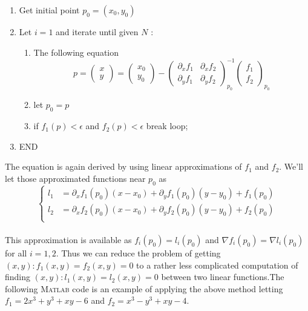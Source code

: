 \documentclass[paper=a4, fontsize=11pt]{scrartcl}
\newcommand{\MATLAB}{\textsc{Matlab}\xspace}
\begin{document}
\begin{enumerate}[label=\arabic*)]
	\item Get initial point $p_0=(x_0,y_0)$
	\item Let $i=1$ and iterate until given $N$ :
	\begin{enumerate}[label=(\arabic*)]
		\item The following equation \\
		\begin{equation}\nonumber
			p =
			\begin{pmatrix}
			 x \\ y
			\end{pmatrix}
			= 
			\begin{pmatrix}
			x_0 \\ y_0
			\end{pmatrix}
			-
			\begin{pmatrix}
			\partial_x f_1 & \partial_x f_2\\
			\partial_y f_1 & \partial_y f_2 
			\end{pmatrix}^{-1}_{p_0}
			\begin{pmatrix}
			f_1 \\ f_2
			\end{pmatrix}_{p_0}
		\end{equation}
		\item let $p_0=p$
		\item if $f_1(p) < \epsilon$ and $f_2(p) < \epsilon$ break loop;
	\end{enumerate}
	\item END \\
\end{enumerate} 

The equation is again derived by using linear approximations of $f_1$ and $f_2$. We'll let those approximated functions near $p_0$ as \\

\begin{equation}\nonumber
	\begin{cases}
	l_1 &= \partial_x f_1(p_0) (x-x_0)+ \partial_y f_1(p_0) (y-y_0) + f_1(p_0)\\
	l_2 &= \partial_x f_2(p_0) (x-x_0)+ \partial_y f_2(p_0) (y-y_0) + f_2(p_0) \\
	\end{cases}
\end{equation}\\

This approximation is available as $f_i(p_0)=l_i(p_0)$ and $\nabla f_i(p_0) = \nabla l_i (p_0)$ for all $i=1,2$. Thus we can reduce the problem of getting $(x,y) : f_1(x,y)=f_2(x,y)=0$ to a rather less complicated computation of finding $(x,y) : l_1(x,y) = l_2(x,y)=0$ between two linear functions.The following \MATLAB code is an example of applying the above method letting $f_1 = 2x^3 + y^3 +xy -6$ and $f_2 = x^3 - y^3 +xy -4$.\\
\end{document}
